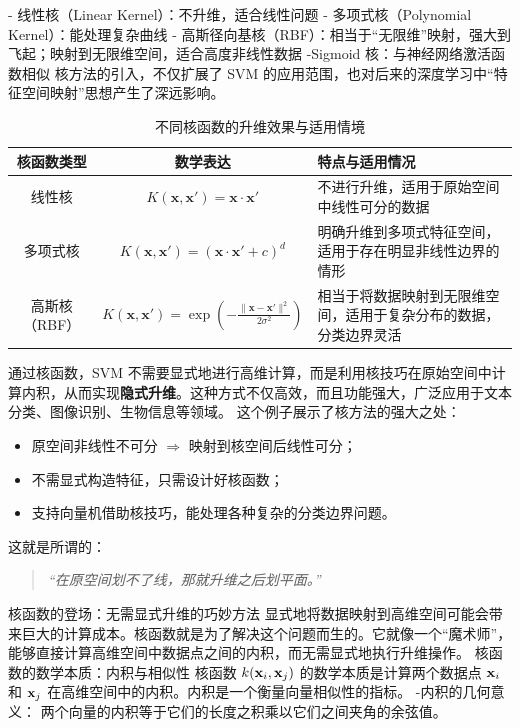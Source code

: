 - 线性核（Linear Kernel）：不升维，适合线性问题
- 多项式核（Polynomial Kernel）：能处理复杂曲线
- 高斯径向基核（RBF）：相当于“无限维”映射，强大到飞起；映射到无限维空间，适合高度非线性数据
-Sigmoid 核：与神经网络激活函数相似
核方法的引入，不仅扩展了 SVM 的应用范围，也对后来的深度学习中“特征空间映射”思想产生了深远影响。\begin{table}[htbp]
\centering
\caption{不同核函数的升维效果与适用情境}
\begin{tabular}{|c|c|p{7cm}|}
\hline
\textbf{核函数类型} & \textbf{数学表达} & \textbf{特点与适用情况} \\
\hline
线性核 & \( K(\mathbf{x}, \mathbf{x}') = \mathbf{x} \cdot \mathbf{x}' \) & 不进行升维，适用于原始空间中线性可分的数据 \\
\hline
多项式核 & \( K(\mathbf{x}, \mathbf{x}') = (\mathbf{x} \cdot \mathbf{x}' + c)^d \) & 明确升维到多项式特征空间，适用于存在明显非线性边界的情形 \\
\hline
高斯核（RBF） & \( K(\mathbf{x}, \mathbf{x}') = \exp\left(-\frac{\|\mathbf{x} - \mathbf{x}'\|^2}{2\sigma^2}\right) \) & 相当于将数据映射到无限维空间，适用于复杂分布的数据，分类边界灵活 \\
\hline
\end{tabular}
\label{tab:kernel_comparison}
\end{table}
通过核函数，SVM 不需要显式地进行高维计算，而是利用核技巧在原始空间中计算内积，从而实现\textbf{隐式升维}。这种方式不仅高效，而且功能强大，广泛应用于文本分类、图像识别、生物信息等领域。
这个例子展示了核方法的强大之处：
\begin{itemize}
    \item 原空间非线性不可分 $\Rightarrow$ 映射到核空间后线性可分；
    \item 不需显式构造特征，只需设计好核函数；
    \item 支持向量机借助核技巧，能处理各种复杂的分类边界问题。
\end{itemize}
这就是所谓的：
\begin{quote}
\itshape
“在原空间划不了线，那就升维之后划平面。”
\end{quote}
 核函数的登场：无需显式升维的巧妙方法
显式地将数据映射到高维空间可能会带来巨大的计算成本。核函数就是为了解决这个问题而生的。它就像一个“魔术师”，能够直接计算高维空间中数据点之间的内积，而无需显式地执行升维操作。
 核函数的数学本质：内积与相似性
核函数 $k({\bf x}_i, {\bf x}_j)$ 的数学本质是计算两个数据点 ${\bf x}_i$ 和 ${\bf x}_j$ 在高维空间中的内积。内积是一个衡量向量相似性的指标。
-内积的几何意义： 两个向量的内积等于它们的长度之积乘以它们之间夹角的余弦值。

